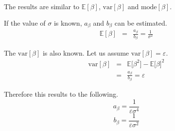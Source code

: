 \documentclass[11pt]{article}
\newcommand{\mean}[1]{\mathbb{E}\left[#1\right]}
\begin{document}
The results are similar to $\mean{\beta}$, $\text{var}\left[\beta\right]$ and $\text{mode}\left[\beta\right]$.

If the value of $\sigma$ is known, $a_{\beta}$ and $b_{\beta}$ can be estimated.
\begin{eqnarray}
    \mean{\beta} &=& \frac{a_{\beta}}{b_{\beta}} = \frac{1}{\sigma^2}
\end{eqnarray}

The $\text{var}\left[\beta\right]$ is also known. Let us assume $\text{var}\left[\beta\right] = \varepsilon$.
\begin{eqnarray}
    \text{var}\left[\beta\right]
    &=& \mathbb{E}\big[\beta^2\big] - \mathbb{E}\big[\beta\big]^2 \\
    &=& \frac{a_{\beta}}{b_{\beta}} = \varepsilon
\end{eqnarray}

Therefore this results to the following.
\begin{equation}
    a_{\beta} = \frac{1}{\varepsilon\sigma^4}
\end{equation}
\begin{equation}
    b_{\beta} = \frac{1}{\varepsilon\sigma^2}
\end{equation}
\end{document}

